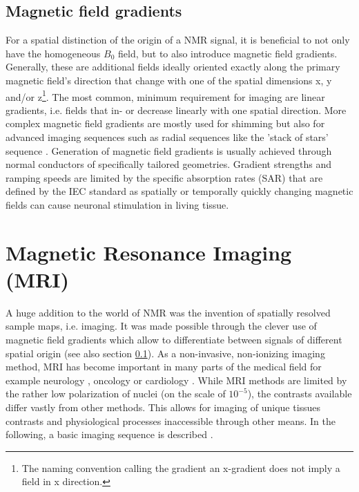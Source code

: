         \subsection{Magnetic field gradients}
            \label{sec:theory:magneticGradient}
            For a spatial distinction of the origin of a NMR signal, it is beneficial to not only have the homogeneous $B_0$ field, but to also introduce magnetic field gradients. Generally, these are additional fields ideally oriented exactly along the primary magnetic field's direction that change with one of the spatial dimensions x, y and/or z\footnote[2]{The naming convention calling the gradient an x-gradient does not imply a field in x direction.}. The most common, minimum requirement for imaging are linear gradients, i.e. fields that in- or decrease linearly with one spatial direction. More complex magnetic field gradients \cite{littin_development_2018} are mostly used for shimming \cite{kim_regularized_2002} but also for advanced imaging sequences such as radial sequences like the 'stack of stars' sequence \cite{burdumy_one-second_2016}. Generation of magnetic field gradients is usually achieved through normal conductors of specifically tailored geometries. Gradient strengths and ramping speeds are limited by the specific absorption rates (SAR) that are defined by the IEC standard \cite{noauthor_iec_nodate} as spatially or temporally quickly changing magnetic fields can cause neuronal stimulation in living tissue. 
    \section{Magnetic Resonance Imaging (MRI)}
        \label{sec:theory:MRI}
        A huge addition to the world of NMR was the invention of spatially resolved sample maps, i.e. imaging. It was made possible through the clever use of magnetic field gradients which allow to differentiate between signals of different spatial origin (see also section \ref{sec:theory:magneticGradient}).
        As a non-invasive, non-ionizing imaging method, MRI has become important in many parts of the medical field for example neurology \cite{frisoni_clinical_2010}, oncology \cite{padhani_dynamic_2002} or cardiology \cite{constantine_role_2004}. While MRI methods are limited by the rather low polarization of nuclei (on the scale of $10^{-5}$), the contrasts available differ vastly from other methods. This allows for imaging of unique tissues contrasts and physiological processes inaccessible through other means. In the following, a basic imaging sequence is described \cite{noauthor_wiley-vch_nodate}.
